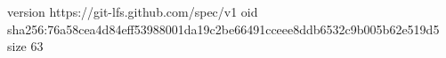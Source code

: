 version https://git-lfs.github.com/spec/v1
oid sha256:76a58cea4d84eff53988001da19c2be66491cceee8ddb6532c9b005b62e519d5
size 63
